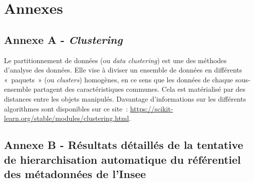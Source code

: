 \section*{Annexes}

\subsection*{Annexe A - \textit{Clustering}}
Le partitionnement de données (ou \textit{data clustering}) est une des méthodes d'analyse des données. Elle vise à diviser un ensemble de données en différents «~paquets~» (ou \textit{clusters}) homogènes, en ce sens que les données de chaque sous-ensemble partagent des caractéristiques communes. Cela est matérialisé par des distances entre les objets manipulés. Davantage d'informations sur les différents algorithmes sont disponibles sur ce site~: \href{https://scikit-learn.org/stable/modules/clustering.html}{https://scikit-learn.org/stable/modules/clustering.html}.
\label{clustering}
\newpage

\subsection*{Annexe B - Résultats détaillés de la tentative de hierarchisation automatique du référentiel des métadonnées de l'Insee}
\label{hierarchisation}
\newpage

